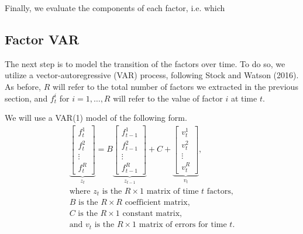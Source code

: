 \documentclass[11pt, letterpaper]{article}\usepackage[]{graphicx}\usepackage[]{color}
\makeatletter
\newenvironment{kframe}{%
 \def\at@end@of@kframe{}%
 \ifinner\ifhmode%
  \def\at@end@of@kframe{\end{minipage}}%
  \begin{minipage}{\columnwidth}%
 \fi\fi%
 \def\FrameCommand##1{\hskip\@totalleftmargin \hskip-\fboxsep
 \colorbox{shadecolor}{##1}\hskip-\fboxsep
     \hskip-\linewidth \hskip-\@totalleftmargin \hskip\columnwidth}%
 \MakeFramed {\advance\hsize-\width
   \@totalleftmargin\z@ \linewidth\hsize
   \@setminipage}}%
 {\par\unskip\endMakeFramed%
 \at@end@of@kframe}
\makeatother
\begin{document}
Finally, we evaluate the components of each factor, i.e. which 
\begin{kframe}


{\ttfamily\noindent\bfseries{}}\end{kframe}



\subsection{Factor VAR}
The next step is to model the transition of the factors over time. To do so, we utilize a vector-autoregressive (VAR) process, following Stock and Watson (2016). As before, $R$ will refer to the total number of factors we extracted in the previous section, and $f^i_t$ for $i = 1, \dots, R$ will refer to the value of factor $i$ at time $t$.

We will use a VAR(1) model of the following form.
\begin{align*}
\underbrace{\begin{bmatrix}
	f^1_{t}\\
	f^2_{t}\\
	\vdots \\
	f^R_{t}
\end{bmatrix}}_{z_t}
=
B
\underbrace{\begin{bmatrix}
	f^1_{t-1}\\
	f^2_{t-1}\\
	\vdots \\
	f^R_{t-1}
\end{bmatrix}}_{z_{t-1}}
+
C
+
\underbrace{\begin{bmatrix}
v^1_t\\
v^2_t\\
\vdots\\
v^R_t
\end{bmatrix}}_{v_t},\\
\text{where $z_t$ is the $R \times 1$ matrix of time $t$ factors,}\\
\text{$B$ is the $R \times R$ coefficient matrix,}\\
\text{$C$ is the $R \times 1$ constant matrix,}\\
\text{and $v_t$ is the $R \times 1$ matrix of errors for time $t$.}
\end{align*}
\end{document}
